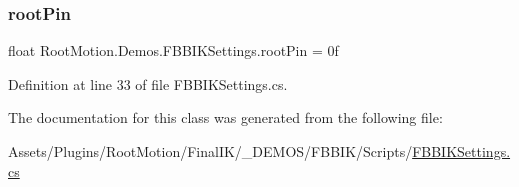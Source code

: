 \subsubsection{\texorpdfstring{root\+Pin}{rootPin}}
{\footnotesize\ttfamily float Root\+Motion.\+Demos.\+F\+B\+B\+I\+K\+Settings.\+root\+Pin = 0f}



Definition at line 33 of file F\+B\+B\+I\+K\+Settings.\+cs.



The documentation for this class was generated from the following file\+:\begin{DoxyCompactItemize}
\item 
Assets/\+Plugins/\+Root\+Motion/\+Final\+I\+K/\+\_\+\+D\+E\+M\+O\+S/\+F\+B\+B\+I\+K/\+Scripts/\mbox{\hyperlink{_f_b_b_i_k_settings_8cs}{F\+B\+B\+I\+K\+Settings.\+cs}}\end{DoxyCompactItemize}
